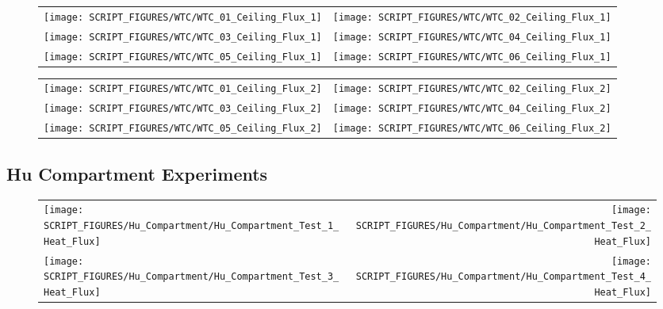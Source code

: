 \begin{figure}[p]
\begin{tabular*}{\textwidth}{l@{\extracolsep{\fill}}r}
\texttt{[image: SCRIPT\_FIGURES/WTC/WTC\_01\_Ceiling\_Flux\_1]} &
\texttt{[image: SCRIPT\_FIGURES/WTC/WTC\_02\_Ceiling\_Flux\_1]} \\
\texttt{[image: SCRIPT\_FIGURES/WTC/WTC\_03\_Ceiling\_Flux\_1]} &
\texttt{[image: SCRIPT\_FIGURES/WTC/WTC\_04\_Ceiling\_Flux\_1]} \\
\texttt{[image: SCRIPT\_FIGURES/WTC/WTC\_05\_Ceiling\_Flux\_1]} &
\texttt{[image: SCRIPT\_FIGURES/WTC/WTC\_06\_Ceiling\_Flux\_1]}
\end{tabular*}
\label{NIST_WTC_Ceiling_Flux_1}
\end{figure}

\begin{figure}[p]
\begin{tabular*}{\textwidth}{l@{\extracolsep{\fill}}r}
\texttt{[image: SCRIPT\_FIGURES/WTC/WTC\_01\_Ceiling\_Flux\_2]} &
\texttt{[image: SCRIPT\_FIGURES/WTC/WTC\_02\_Ceiling\_Flux\_2]} \\
\texttt{[image: SCRIPT\_FIGURES/WTC/WTC\_03\_Ceiling\_Flux\_2]} &
\texttt{[image: SCRIPT\_FIGURES/WTC/WTC\_04\_Ceiling\_Flux\_2]} \\
\texttt{[image: SCRIPT\_FIGURES/WTC/WTC\_05\_Ceiling\_Flux\_2]} &
\texttt{[image: SCRIPT\_FIGURES/WTC/WTC\_06\_Ceiling\_Flux\_2]}
\end{tabular*}
\label{NIST_WTC_Ceiling_Flux_2}
\end{figure}


\clearpage


\subsection{Hu Compartment Experiments}

\begin{figure}[p]
\begin{tabular*}{\textwidth}{l@{\extracolsep{\fill}}r}
\texttt{[image: SCRIPT\_FIGURES/Hu\_Compartment/Hu\_Compartment\_Test\_1\_Heat\_Flux]} &
\texttt{[image: SCRIPT\_FIGURES/Hu\_Compartment/Hu\_Compartment\_Test\_2\_Heat\_Flux]} \\
\texttt{[image: SCRIPT\_FIGURES/Hu\_Compartment/Hu\_Compartment\_Test\_3\_Heat\_Flux]} &
\texttt{[image: SCRIPT\_FIGURES/Hu\_Compartment/Hu\_Compartment\_Test\_4\_Heat\_Flux]}
\\
\end{tabular*}
\label{Hu_Heat_Flux}
\end{figure}


